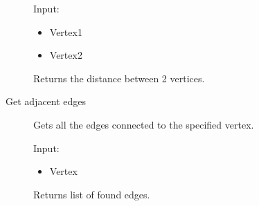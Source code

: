\begin{description}
	Input:
	\begin{itemize}
		\item Vertex1
		\item Vertex2
	\end{itemize}
	Returns the distance between 2 vertices.
	\item[Get adjacent edges] 
	Gets all the edges connected to the specified vertex.

	Input:
	\begin{itemize}
		\item Vertex
	\end{itemize}
	Returns list of found edges.
\end{description}





